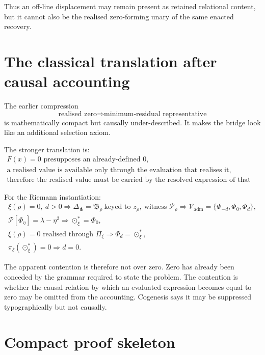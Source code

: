 \documentclass[11pt]{article}
\newcommand{\Pheart}{\mathcal P}
\newcommand{\DeltaFork}{\Delta_{\pitchfork}}
\begin{document}
Thus an off-line displacement may remain present as retained relational content, but it cannot also be the realised zero-forming unary of the same enacted recovery.

\section{The classical translation after causal accounting}

The earlier compression
\[
\text{realised zero}
\Longrightarrow
\text{minimum-residual representative}
\]
is mathematically compact but causally under-described. It makes the bridge look like an additional selection axiom.

The stronger translation is:
\[
\boxed{
\begin{gathered}
F(x)=0\text{ presupposes an already-defined }0,\\[2pt]
\text{a realised value is available only through the evaluation that realises it},\\[2pt]
\text{therefore the realised value must be carried by the resolved expression of that evaluation.}
\end{gathered}}
\]

For the Riemann instantiation:
\[
\boxed{
\begin{gathered}
\xi(\rho)=0,\ d>0
\Longrightarrow
\DeltaFork=\mathfrak B_\rho\ \text{keyed to }z_\rho,
\ \text{witness }\mathcal P_\rho
\Longrightarrow
\mathcal V_{\mathrm{adm}}
=
\{\Phi_{-d},\Phi_0,\Phi_d\},\\[2pt]
\Pheart[\Phi_\eta]
=
\lambda-\eta^2
\Longrightarrow
\odot_\xi^\ast=\Phi_0,\\[2pt]
\xi(\rho)=0
\text{ realised through }\Pi_\xi
\Longrightarrow
\Phi_d=\odot_\xi^\ast,\\[2pt]
\pi_\delta(\odot_\xi^\ast)=0
\Longrightarrow
d=0.
\end{gathered}}
\]

The apparent contention is therefore not over zero. Zero has already been conceded by the grammar required to state the problem. The contention is whether the causal relation by which an evaluated expression becomes equal to zero may be omitted from the accounting. Cogenesis says it may be suppressed typographically but not causally.

\section{Compact proof skeleton}
\end{document}
